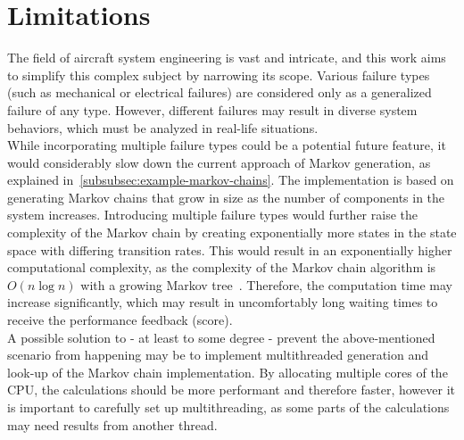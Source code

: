\section{Limitations}\label{sec:limitations}
The field of aircraft system engineering is vast and intricate, and this work aims to simplify this complex subject by narrowing its scope.
Various failure types (such as mechanical or electrical failures) are considered only as a generalized failure of any type.
However, different failures may result in diverse system behaviors, which must be analyzed in real-life situations.
\\
While incorporating multiple failure types could be a potential future feature, it would considerably slow down the current
approach of Markov generation, as explained in~\ref{subsubsec:example-markov-chains}.
The implementation is based on generating Markov chains that grow in size as the number of components in the system increases.
Introducing multiple failure types would further raise the complexity of the Markov chain by creating exponentially more states in the state space
with differing transition rates.
This would result in an exponentially higher computational complexity, as the complexity of the Markov chain algorithm is
$O(n \log{n})$ with a growing Markov tree~\cite{10.2307/2337551}.
Therefore, the computation time may increase significantly, which may result in uncomfortably long waiting times to receive the
performance feedback (score).
\\
A possible solution to - at least to some degree - prevent the above-mentioned scenario from happening may be to implement multithreaded
generation and look-up of the Markov chain implementation.
By allocating multiple cores of the \gls{CPU}, the calculations should be more performant and therefore faster, however it is important
to carefully set up multithreading, as some parts of the calculations may need results from another thread.
